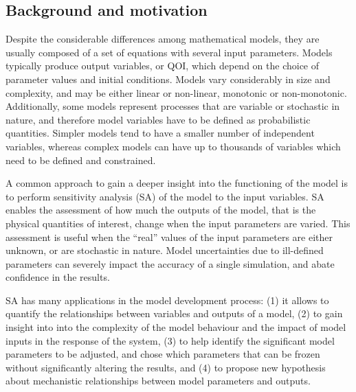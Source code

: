\documentclass[12pt]{article}
\begin{document}
 \subsection{Background and motivation}
 
 Despite the considerable differences among mathematical models, they are usually composed of a set of equations with several input parameters. Models typically produce output variables, or QOI, which depend on the choice of parameter values and initial conditions. Models vary considerably in size and complexity, and may be either linear or non-linear, monotonic or non-monotonic. Additionally, some models represent processes that are variable or stochastic in nature, and therefore model variables have to be defined as probabilistic quantities. Simpler models tend to have a smaller number of independent variables, whereas complex models can have up to thousands of variables which need to be defined and constrained.
  
 A common approach to gain a deeper insight into the functioning of the model is to perform sensitivity analysis (SA) of the model to the input variables. SA enables the assessment of how much the outputs of the model, that is the physical quantities of interest, change when the input parameters are varied. This assessment is useful when the ``real'' values of the input parameters are either unknown, or are stochastic in nature. Model uncertainties due to ill-defined parameters can severely impact the accuracy of a single simulation, and abate confidence in the results. 
 
SA has many applications in the model development process: (1) it allows to quantify the relationships between variables and outputs of a model, (2) to gain insight into into the complexity of the model behaviour and the impact of model inputs in the response of the system, (3) to help identify the significant model parameters to be adjusted, and chose which parameters that can be frozen without significantly altering the results, and (4) to propose new hypothesis about mechanistic relationships between model parameters and outputs. 
\end{document}
